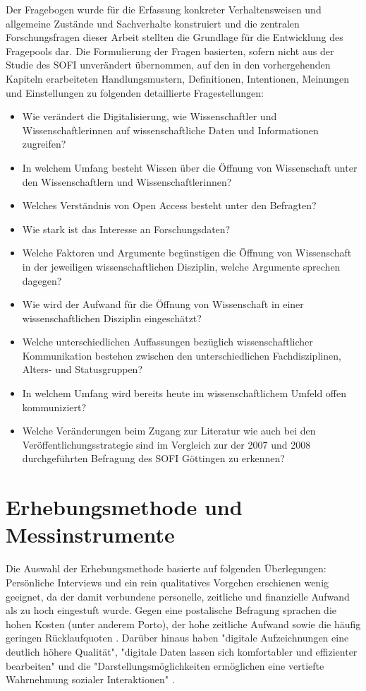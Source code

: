 Der Fragebogen wurde für die Erfassung konkreter Verhaltensweisen und allgemeine Zustände und Sachverhalte \cite{raab_2012_fragebogen} konstruiert und die zentralen Forschungsfragen dieser Arbeit stellten die Grundlage für die Entwicklung des Fragepools dar. Die Formulierung der Fragen basierten, sofern nicht aus der Studie des SOFI unverändert übernommen, auf den in den vorhergehenden Kapiteln erarbeiteten Handlungsmustern, Definitionen, Intentionen, Meinungen und Einstellungen zu folgenden detaillierte Fragestellungen:
\begin{itemize}
\item Wie verändert die Digitalisierung, wie Wissenschaftler und Wissenschaftlerinnen auf wissenschaftliche Daten und Informationen zugreifen?
\item In welchem Umfang besteht Wissen über die Öffnung von Wissenschaft unter den Wissenschaftlern und Wissenschaftlerinnen?
\item Welches Verständnis von Open Access besteht unter den Befragten?
\item Wie stark ist das Interesse an Forschungsdaten?
\item Welche Faktoren und Argumente begünstigen die Öffnung von Wissenschaft in der jeweiligen wissenschaftlichen Disziplin, welche Argumente sprechen dagegen?
\item Wie wird der Aufwand für die Öffnung von Wissenschaft in einer wissenschaftlichen Disziplin eingeschätzt?
\item Welche unterschiedlichen Auffassungen bezüglich wissenschaftlicher Kommunikation bestehen zwischen den unterschiedlichen Fachdisziplinen, Alters- und Statusgruppen?
\item In welchem Umfang wird bereits heute im wissenschaftlichem Umfeld offen kommuniziert?
\item Welche Veränderungen beim Zugang zur Literatur wie auch bei den Veröffentlichungsstrategie sind im Vergleich zur der 2007 und 2008 durchgeführten Befragung des SOFI Göttingen zu erkennen?
\end{itemize}

\section{Erhebungsmethode und Messinstrumente}

Die Auswahl der Erhebungsmethode basierte auf folgenden Überlegungen: Persönliche Interviews und ein rein qualitatives Vorgehen erschienen wenig geeignet, da der damit verbundene personelle, zeitliche und finanzielle Aufwand als zu hoch eingestuft wurde. Gegen eine postalische Befragung sprachen die hohen Kosten (unter anderem Porto), der hohe zeitliche Aufwand sowie die häufig geringen Rücklaufquoten \cite{suchen}. Darüber hinaus haben "digitale Aufzeichnungen eine deutlich höhere Qualität", "digitale Daten lassen sich komfortabler und effizienter bearbeiten" und die "Darstellungsmöglichkeiten ermöglichen eine vertiefte Wahrnehmung sozialer Interaktionen" \cite{Hartung_2011_digitalisierung}.

